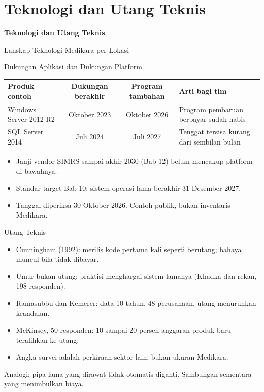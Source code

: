 \documentclass[aspectratio=169, table, 12pt]{beamer}
\begin{document}
\section{Teknologi dan Utang Teknis}

\begin{frame}{\hfill}
  \centering
  \Huge{\textbf{Teknologi dan Utang Teknis}}
\end{frame}

\begin{frame}{{\Large Lanskap Teknologi Medikara per Lokasi}}
  \centering
\end{frame}

\begin{frame}{{\Large Dukungan Aplikasi dan Dukungan Platform}}
  \footnotesize
  \begin{tabularx}{\textwidth}{>{\raggedright\arraybackslash}p{3.9cm}cc>{\raggedright\arraybackslash}X}
    \hline
    \textbf{Produk contoh} & \textbf{Dukungan berakhir} & \textbf{Program tambahan} & \textbf{Arti bagi tim} \\
    \hline
    Windows Server 2012 R2 & Oktober 2023 & Oktober 2026 & Program pembaruan berbayar sudah habis \\
    \hline
    SQL Server 2014 & Juli 2024 & Juli 2027 & Tenggat tersisa kurang dari sembilan bulan \\
    \hline
  \end{tabularx}

  \vspace{8pt}
  \begin{itemize}
    \item Janji vendor SIMRS sampai akhir 2030 (Bab 12) belum mencakup platform di bawahnya.
    \item Standar target Bab 10: sistem operasi lama berakhir 31 Desember 2027.
    \item Tanggal diperiksa 30 Oktober 2026. Contoh publik, bukan inventaris Medikara.
  \end{itemize}
\end{frame}

\begin{frame}{{\Large Utang Teknis}}
  \vspace{10pt}
  \begin{itemize}
    \item Cunningham (1992): merilis kode pertama kali seperti berutang; bahaya muncul bila tidak dibayar.
    \item Umur bukan utang: praktisi menghargai sistem lamanya (Khadka dan rekan, 198 responden).
    \item Ramasubbu dan Kemerer: data 10 tahun, 48 perusahaan, utang menurunkan keandalan.
    \item McKinsey, 50 responden: 10 sampai 20 persen anggaran produk baru teralihkan ke utang.
    \item Angka survei adalah perkiraan sektor lain, bukan ukuran Medikara.
  \end{itemize}
  \vspace{6pt}
  {\small Analogi: pipa lama yang dirawat tidak otomatis diganti. Sambungan sementara yang menimbulkan biaya.}
\end{frame}
\end{document}

